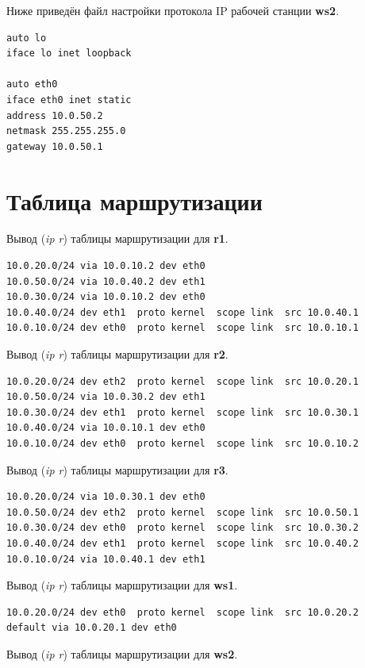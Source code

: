 \documentclass[a4paper,12pt]{article}
\begin{document}
Ниже приведён файл настройки протокола IP рабочей станции \textbf{ws2}.

\begin{Verbatim}
auto lo
iface lo inet loopback

auto eth0
iface eth0 inet static
address 10.0.50.2
netmask 255.255.255.0
gateway 10.0.50.1
\end{Verbatim}

\section{Таблица маршрутизации}

Вывод (\textit{ip r}) таблицы маршрутизации для \textbf{r1}.

\begin{Verbatim}
10.0.20.0/24 via 10.0.10.2 dev eth0 
10.0.50.0/24 via 10.0.40.2 dev eth1 
10.0.30.0/24 via 10.0.10.2 dev eth0 
10.0.40.0/24 dev eth1  proto kernel  scope link  src 10.0.40.1 
10.0.10.0/24 dev eth0  proto kernel  scope link  src 10.0.10.1 
\end{Verbatim}


Вывод (\textit{ip r}) таблицы маршрутизации для \textbf{r2}.

\begin{Verbatim}
10.0.20.0/24 dev eth2  proto kernel  scope link  src 10.0.20.1 
10.0.50.0/24 via 10.0.30.2 dev eth1 
10.0.30.0/24 dev eth1  proto kernel  scope link  src 10.0.30.1 
10.0.40.0/24 via 10.0.10.1 dev eth0 
10.0.10.0/24 dev eth0  proto kernel  scope link  src 10.0.10.2
\end{Verbatim}

Вывод (\textit{ip r}) таблицы маршрутизации для \textbf{r3}.

\begin{Verbatim}
10.0.20.0/24 via 10.0.30.1 dev eth0 
10.0.50.0/24 dev eth2  proto kernel  scope link  src 10.0.50.1 
10.0.30.0/24 dev eth0  proto kernel  scope link  src 10.0.30.2 
10.0.40.0/24 dev eth1  proto kernel  scope link  src 10.0.40.2 
10.0.10.0/24 via 10.0.40.1 dev eth1 
\end{Verbatim}

Вывод (\textit{ip r}) таблицы маршрутизации для \textbf{ws1}.

\begin{Verbatim}
10.0.20.0/24 dev eth0  proto kernel  scope link  src 10.0.20.2 
default via 10.0.20.1 dev eth0 
\end{Verbatim}

Вывод (\textit{ip r}) таблицы маршрутизации для \textbf{ws2}.
\end{document}
